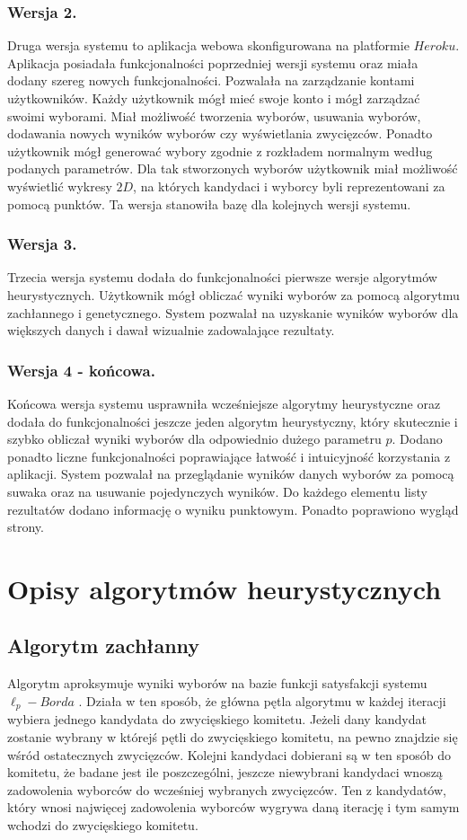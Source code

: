 \documentclass[polish,11pt]{aghthesis}
\begin{document}
\subsubsection{Wersja 2.}
Druga wersja systemu to aplikacja webowa skonfigurowana na platformie $Heroku$. Aplikacja
posiadała funkcjonalności poprzedniej wersji systemu oraz miała dodany szereg nowych
funkcjonalności. Pozwalała na zarządzanie kontami użytkowników. Każdy użytkownik mógł
mieć swoje konto i mógł zarządzać swoimi wyborami. Miał możliwość tworzenia wyborów,
usuwania wyborów, dodawania nowych wyników wyborów czy wyświetlania zwycięzców.
Ponadto użytkownik mógł generować wybory zgodnie z rozkładem normalnym według
podanych parametrów. Dla tak stworzonych wyborów użytkownik miał możliwość wyświetlić
wykresy $2D$, na których kandydaci i wyborcy byli reprezentowani za pomocą punktów. Ta
wersja stanowiła bazę dla kolejnych wersji systemu.

\subsubsection{Wersja 3.}
Trzecia wersja systemu dodała do funkcjonalności pierwsze wersje algorytmów
heurystycznych. Użytkownik mógł obliczać wyniki wyborów za pomocą algorytmu
zachłannego i genetycznego. System pozwalał na uzyskanie wyników wyborów dla
większych danych i dawał wizualnie zadowalające rezultaty.

\subsubsection{Wersja 4 - końcowa.}
Końcowa wersja systemu usprawniła wcześniejsze algorytmy heurystyczne oraz dodała do
funkcjonalności jeszcze jeden algorytm heurystyczny, który skutecznie i szybko obliczał
wyniki wyborów dla odpowiednio dużego parametru $p$. Dodano ponadto liczne
funkcjonalności poprawiające łatwość i intuicyjność korzystania z aplikacji. System pozwalał
na przeglądanie wyników danych wyborów za pomocą suwaka oraz na usuwanie
pojedynczych wyników. Do każdego elementu listy rezultatów dodano informację o wyniku
punktowym. Ponadto poprawiono wygląd strony.

\section{Opisy algorytmów heurystycznych}
\subsection{Algorytm zachłanny}
Algorytm aproksymuje wyniki wyborów na bazie funkcji satysfakcji systemu $\ell_p-Borda$ .
Działa w ten sposób, że główna pętla algorytmu w każdej iteracji wybiera jednego kandydata
do zwycięskiego komitetu. Jeżeli dany kandydat zostanie wybrany w którejś pętli do
zwycięskiego komitetu, na pewno znajdzie się wśród ostatecznych zwycięzców. Kolejni
kandydaci dobierani są w ten sposób do komitetu, że badane jest ile poszczególni, jeszcze
niewybrani kandydaci wnoszą zadowolenia wyborców do wcześniej wybranych zwycięzców.
Ten z kandydatów, który wnosi najwięcej zadowolenia wyborców wygrywa daną iterację i
tym samym wchodzi do zwycięskiego komitetu. 
\end{document}
